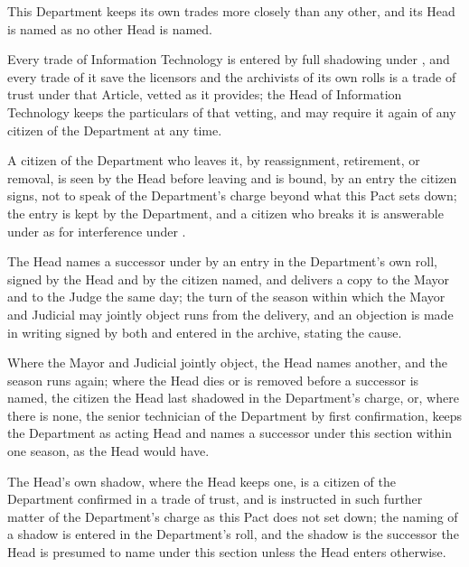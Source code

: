 This Department keeps its own trades more closely than any other, and its Head is named as no other Head is named.

\begin{clauses}
\item Every trade of Information Technology is entered by full shadowing under , and every trade of it save the licensors and the archivists of its own rolls is a trade of trust under that Article, vetted as it provides; the Head of Information Technology keeps the particulars of that vetting, and may require it again of any citizen of the Department at any time.
\item A citizen of the Department who leaves it, by reassignment, retirement, or removal, is seen by the Head before leaving and is bound, by an entry the citizen signs, not to speak of the Department's charge beyond what this Pact sets down; the entry is kept by the Department, and a citizen who breaks it is answerable under  as for interference under .
\item The Head names a successor under  by an entry in the Department's own roll, signed by the Head and by the citizen named, and delivers a copy to the Mayor and to the Judge the same day; the turn of the season within which the Mayor and Judicial may jointly object runs from the delivery, and an objection is made in writing signed by both and entered in the archive, stating the cause.
\item Where the Mayor and Judicial jointly object, the Head names another, and the season runs again; where the Head dies or is removed before a successor is named, the citizen the Head last shadowed in the Department's charge, or, where there is none, the senior technician of the Department by first confirmation, keeps the Department as acting Head and names a successor under this section within one season, as the Head would have.
\item The Head's own shadow, where the Head keeps one, is a citizen of the Department confirmed in a trade of trust, and is instructed in such further matter of the Department's charge as this Pact does not set down; the naming of a shadow is entered in the Department's roll, and the shadow is the successor the Head is presumed to name under this section unless the Head enters otherwise.
\end{clauses}

